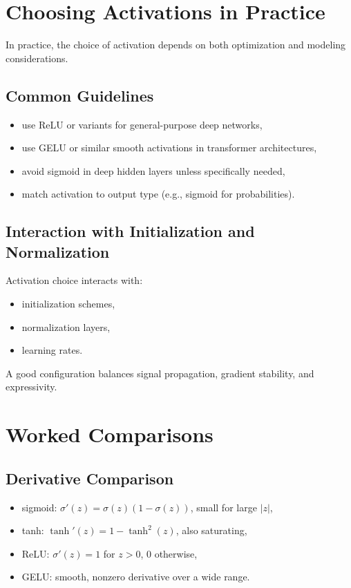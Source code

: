 \section{Choosing Activations in Practice}

In practice, the choice of activation depends on both optimization and modeling considerations.

\subsection{Common Guidelines}

\begin{itemize}
    \item use ReLU or variants for general-purpose deep networks,
    \item use GELU or similar smooth activations in transformer architectures,
    \item avoid sigmoid in deep hidden layers unless specifically needed,
    \item match activation to output type (e.g., sigmoid for probabilities).
\end{itemize}

\subsection{Interaction with Initialization and Normalization}

Activation choice interacts with:
\begin{itemize}
    \item initialization schemes,
    \item normalization layers,
    \item learning rates.
\end{itemize}

A good configuration balances signal propagation, gradient stability, and expressivity.

\section{Worked Comparisons}

\subsection{Derivative Comparison}

\begin{itemize}
    \item sigmoid: $\sigma'(z)=\sigma(z)(1-\sigma(z))$, small for large $|z|$,
    \item tanh: $\tanh'(z)=1-\tanh^2(z)$, also saturating,
    \item ReLU: $\sigma'(z)=1$ for $z>0$, $0$ otherwise,
    \item GELU: smooth, nonzero derivative over a wide range.
\end{itemize}

